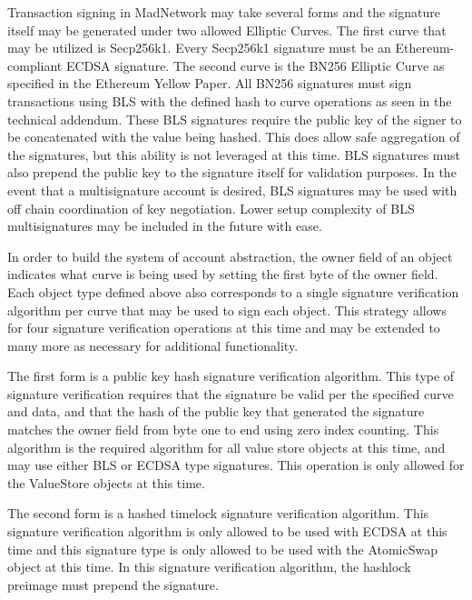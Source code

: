 Transaction signing in MadNetwork may take several forms and the
signature itself may be generated under two allowed Elliptic Curves.
The first curve that may be utilized is Secp256k1.
Every Secp256k1 signature must be an Ethereum-compliant ECDSA signature.
The second curve is the BN256 Elliptic Curve as specified in the
Ethereum Yellow Paper.
All BN256 signatures must sign transactions using BLS with the defined
hash to curve operations as seen in the technical addendum.
These BLS signatures require the public key of the signer to be
concatenated with the value being hashed.
This does allow safe aggregation of the signatures, but this ability is
not leveraged at this time.
BLS signatures must also prepend the public key to the signature itself
for validation purposes.
In the event that a multisignature account is desired, BLS signatures
may be used with off chain coordination of key negotiation.
Lower setup complexity of BLS multisignatures may be included in the
future with ease.

In order to build the system of account abstraction, the owner field of
an object indicates what curve is being used by setting the first byte
of the owner field.
Each object type defined above also corresponds to a single signature
verification algorithm per curve that may be used to sign each object.
This strategy allows for four signature verification operations at this
time and may be extended to many more as necessary for additional
functionality.

The first form is a public key hash signature verification algorithm.
This type of signature verification requires that the signature be
valid per the specified curve and data, and that the hash of the public
key that generated the signature matches the owner field from byte one
to end using zero index counting.
This algorithm is the required algorithm for all value store objects at
this time, and may use either BLS or ECDSA type signatures.
This operation is only allowed for the ValueStore objects at this time.

The second form is a hashed timelock signature verification algorithm.
This signature verification algorithm is only allowed to be used with
ECDSA at this time and this signature type is only allowed to be used
with the AtomicSwap object at this time.
In this signature verification algorithm, the hashlock preimage must
prepend the signature.

